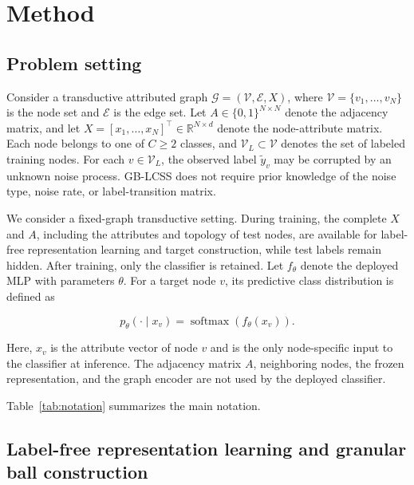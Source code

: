 \documentclass[10pt,letterpaper,nopreprintline]{elsarticle}
\theoremstyle{plain}
\begin{document}
\FloatBarrier

\section{Method}\label{sec:3}

\subsection{Problem setting}\label{sec:3.1}

Consider a transductive attributed graph \(\mathcal{G} = \left( \mathcal{V},\mathcal{E},X \right)\), where \(\mathcal{V} = \{ v_{1},\ldots,v_{N}\}\) is the node set and \(\mathcal{E}\) is the edge set. Let \(A \in \{ 0,1\}^{N \times N}\) denote the adjacency matrix, and let \(X = \left\lbrack x_{1},\ldots,x_{N} \right\rbrack^{\top} \in \mathbb{R}^{N \times d}\) denote the node-attribute matrix. Each node belongs to one of \(C\geq2\) classes, and \(\mathcal{V}_{L} \subset \mathcal{V}\) denotes the set of labeled training nodes. For each \(v \in \mathcal{V}_{L}\), the observed label \({\widetilde{y}}_{v}\) may be corrupted by an unknown noise process. GB-LCSS does not require prior knowledge of the noise type, noise rate, or label-transition matrix.

\Needspace{64pt}

We consider a fixed-graph transductive setting. During training, the complete \(X\) and \(A\), including the attributes and topology of test nodes, are available for label-free representation learning and target construction, while test labels remain hidden. After training, only the classifier is retained. Let \(f_{\theta}\) denote the deployed MLP with parameters \(\theta\). For a target node \(v\), its predictive class distribution is defined as

\begin{equation}\label{eq:1}
p_{\theta}( \cdot \mid x_{v}) = \operatorname{softmax}\left( f_{\theta}(x_{v}) \right).
\end{equation}

Here, \(x_{v}\) is the attribute vector of node \(v\) and is the only node-specific input to the classifier at inference. The adjacency matrix \(A\), neighboring nodes, the frozen representation, and the graph encoder are not used by the deployed classifier.

Table~\ref{tab:notation} summarizes the main notation.



\subsection{Label-free representation learning and granular ball construction}\label{sec:3.2}
\end{document}
